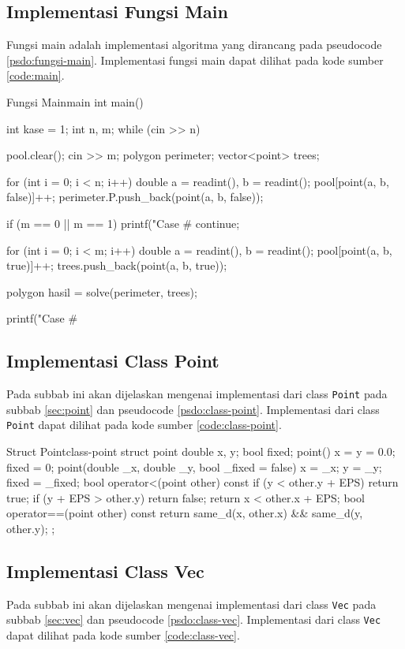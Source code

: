 \subsection{Implementasi Fungsi Main}
Fungsi main adalah implementasi algoritma yang dirancang pada pseudocode \ref{psdo:fungsi-main}. Implementasi fungsi main dapat dilihat pada kode sumber \ref{code:main}. 
\newpage
\begin{code}[firstnumber=1]{Fungsi Main}{main}
int main(){
	int kase = 1;
	int n, m;
	while (cin >> n){
		pool.clear();
		cin >> m;
		polygon perimeter;
		vector<point> trees;

		for (int i = 0; i < n; i++){
			double a = readint(), b = readint();
			pool[point(a, b, false)]++;
			perimeter.P.push_back(point(a, b, false));
		}

		if (m == 0 || m == 1){
			printf("Case #%
			continue;
		}

		for (int i = 0; i < m; i++){
			double a = readint(), b = readint();
			pool[point(a, b, true)]++;
			trees.push_back(point(a, b, true));
		}

		polygon hasil = solve(perimeter, trees);

		printf("Case #%
	}
}
\end{code}

\subsection{Implementasi Class Point}
Pada subbab ini akan dijelaskan mengenai implementasi dari class \texttt{Point} pada subbab \ref{sec:point} dan pseudocode \ref{psdo:class-point}. Implementasi dari class \texttt{Point} dapat dilihat pada kode sumber \ref{code:class-point}.

\begin{code}[firstnumber=1]{Struct Point}{class-point}
struct point{
	double x, y;
	bool fixed;
	point(){
		x = y = 0.0;
		fixed = 0;
	}
	point(double _x, double _y, bool _fixed = false){
		x = _x;
		y = _y;
		fixed = _fixed;
	}
	bool operator<(point other) const{
		if (y < other.y + EPS)
			return true;
		if (y + EPS > other.y)
			return false;
		return x < other.x + EPS;
	}
	bool operator==(point other) const{
		return same_d(x, other.x) && same_d(y, other.y);
	}
};
\end{code}

\subsection{Implementasi Class Vec}
Pada subbab ini akan dijelaskan mengenai implementasi dari class \texttt{Vec} pada subbab \ref{sec:vec} dan pseudocode \ref{psdo:class-vec}. Implementasi dari class \texttt{Vec} dapat dilihat pada kode sumber \ref{code:class-vec}.


